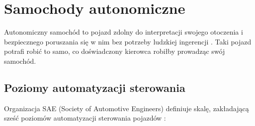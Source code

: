 \chapter{Samochody autonomiczne}
Autonomiczny samochód to pojazd zdolny do interpretacji swojego otoczenia i bezpiecznego poruszania się w nim bez potrzeby ludzkiej ingerencji \cite{synopsys:whatIsAutonomousCar}. Taki pojazd potrafi robić to samo, co doświadczony kierowca robiłby prowadząc swój samochód.

\section{Poziomy automatyzacji sterowania}
Organizacja SAE (Society of Automotive Engineers) definiuje skalę, zakładającą sześć poziomów automatyzacji sterowania pojazdów \cite{synopsys:sixLevelsOfCarAutonomy}:
